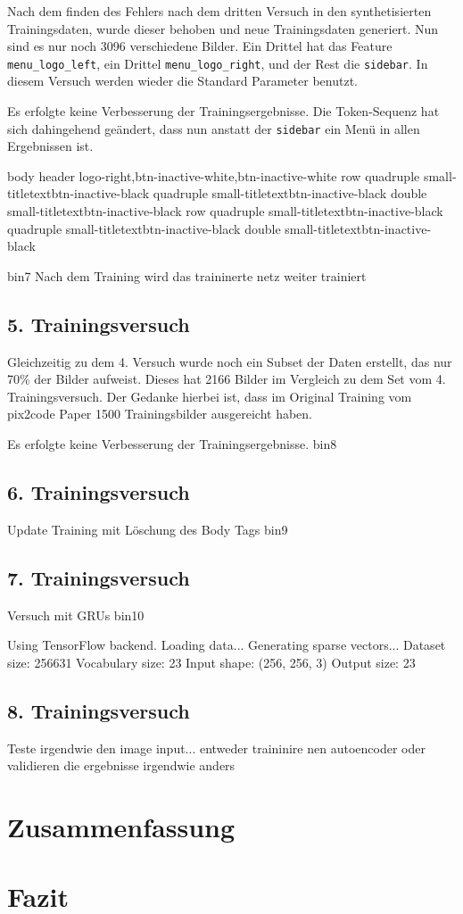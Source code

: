 \documentclass[pdftex,a4paper,halfparskip]{scrartcl}
\begin{document}
Nach dem finden des Fehlers nach dem dritten Versuch in den synthetisierten Trainingsdaten, wurde dieser behoben und neue Trainingsdaten generiert. Nun sind es nur noch 3096 verschiedene Bilder. Ein Drittel hat das Feature \texttt{menu\_logo\_left}, ein Drittel \texttt{menu\_logo\_right}, und der Rest die \texttt{sidebar}. In diesem Versuch werden wieder die Standard Parameter benutzt. 


Es erfolgte keine Verbesserung der Trainingsergebnisse. Die Token-Sequenz hat sich dahingehend geändert, dass nun anstatt der \texttt{sidebar} ein Menü in allen Ergebnissen ist.

\begin{spverbatim}
	body{
	header{
	logo-right,btn-inactive-white,btn-inactive-white
	}
row{
quadruple{
small-titletextbtn-inactive-black
}
quadruple{
small-titletextbtn-inactive-black
}
double{
small-titletextbtn-inactive-black
}
}
row{
quadruple{
small-titletextbtn-inactive-black
}
quadruple{
small-titletextbtn-inactive-black
}
double{
small-titletextbtn-inactive-black
}
}
}
\end{spverbatim}


bin7
Nach dem Training wird das traininerte netz weiter trainiert 


\subsection{5. Trainingsversuch}

Gleichzeitig zu dem 4. Versuch wurde noch ein Subset der Daten erstellt, das nur 70\% der Bilder aufweist. Dieses hat 2166 Bilder im Vergleich zu dem Set vom 4. Trainingsversuch. Der Gedanke hierbei ist, dass im Original Training vom pix2code Paper 1500 Trainingsbilder ausgereicht haben.

Es erfolgte keine Verbesserung der Trainingsergebnisse.
bin8


\subsection{6. Trainingsversuch}

Update Training mit Löschung des Body Tags
bin9

\subsection{7. Trainingsversuch}

Versuch mit GRUs \cite{GRUvsLSTM}
bin10

Using TensorFlow backend.
Loading data...
Generating sparse vectors...
Dataset size: 256631
Vocabulary size: 23
Input shape: (256, 256, 3)
Output size: 23
\subsection{8. Trainingsversuch}

Teste irgendwie den image input... entweder traininire nen autoencoder oder validieren die ergebnisse irgendwie anders




\section{Zusammenfassung}
\section{Fazit}


 
\end{document}
